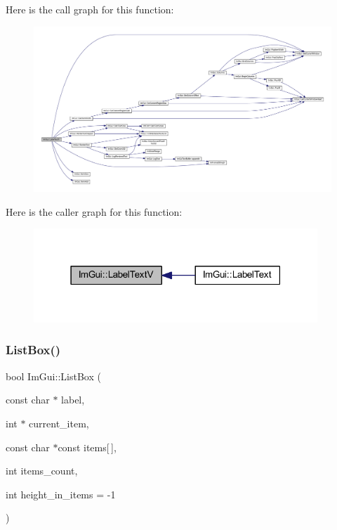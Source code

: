 Here is the call graph for this function\+:
\nopagebreak
\begin{figure}[H]
\begin{center}
\leavevmode
\includegraphics[width=350pt]{namespace_im_gui_a55e5a7edb676a8f5cd7f65443138a8a0_cgraph}
\end{center}
\end{figure}
Here is the caller graph for this function\+:
\nopagebreak
\begin{figure}[H]
\begin{center}
\leavevmode
\includegraphics[width=303pt]{namespace_im_gui_a55e5a7edb676a8f5cd7f65443138a8a0_icgraph}
\end{center}
\end{figure}
\mbox{\label{namespace_im_gui_a44379fe654f54ae8bd8cc1b88bf7c822}} 
\subsubsection{\texorpdfstring{List\+Box()}{ListBox()}\hspace{0.1cm}{\footnotesize\ttfamily [1/2]}}
{\footnotesize\ttfamily bool Im\+Gui\+::\+List\+Box (\begin{DoxyParamCaption}\item[{const char $\ast$}]{label,  }\item[{int $\ast$}]{current\+\_\+item,  }\item[{const char $\ast$const}]{items\mbox{[}$\,$\mbox{]},  }\item[{int}]{items\+\_\+count,  }\item[{int}]{height\+\_\+in\+\_\+items = {\ttfamily -\/1} }\end{DoxyParamCaption})}

